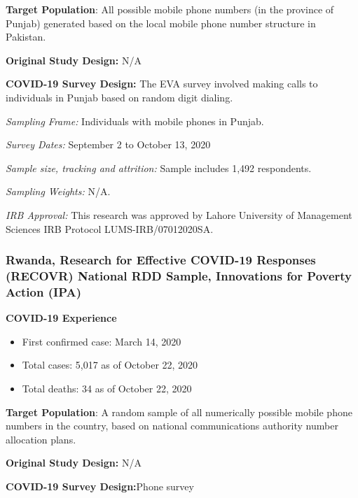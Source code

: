 \documentclass[
  12pt,
]{article}
\begin{document}
\textbf{Target Population}: All possible mobile phone numbers (in the province of Punjab) generated based on the local mobile phone number structure in Pakistan.

\textbf{Original Study Design:} N/A

\textbf{COVID-19 Survey Design:} The EVA survey involved making calls to individuals in Punjab based on random digit dialing.

\emph{Sampling Frame:} Individuals with mobile phones in Punjab.

\emph{Survey Dates:} September 2 to October 13, 2020

\emph{Sample size, tracking and attrition:} Sample includes 1,492 respondents.

\emph{Sampling Weights:} N/A.

\emph{IRB Approval:} This research was approved by Lahore University of Management Sciences IRB Protocol LUMS-IRB/07012020SA.

\hypertarget{rwanda-research-for-effective-covid-19-responses-recovr-national-rdd-sample-innovations-for-poverty-action-ipa}{%
\subsubsection*{Rwanda, Research for Effective COVID-19 Responses (RECOVR) National RDD Sample, Innovations for Poverty Action (IPA)}\label{rwanda-research-for-effective-covid-19-responses-recovr-national-rdd-sample-innovations-for-poverty-action-ipa}}

\textbf{COVID-19 Experience}

\begin{itemize}
 \item First confirmed case: March 14, 2020
 \item Total cases:  5,017 as of October 22, 2020 
\item Total deaths:  34 as of October 22, 2020 
\end{itemize}

\textbf{Target Population}: A random sample of all numerically possible mobile phone numbers in the country, based on national communications authority number allocation plans.

\textbf{Original Study Design:} N/A

\textbf{COVID-19 Survey Design:}Phone survey
\end{document}
